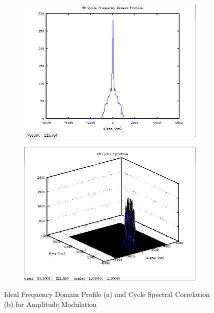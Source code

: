 \begin{figure}
\centering
\begin{subfigure}{.49\textwidth}
\centering
\includegraphics[width=\linewidth]{../img/Report_AM_Ia_Ideal.png}
  \caption{ }
  \label{fig:idealProfile_AM}
\end{subfigure}
\begin{subfigure}{.49\textwidth}
  \centering
  \includegraphics[width=\linewidth]{../img/Report_AM_Sxa_Ideal.png}
  \caption{ }
  \label{fig:idealCycle_AM}
\end{subfigure}
\caption{Ideal Frequency Domain Profile (a) and Cycle Spectral Correlation (b)
for Amplitude Modulation}
\label{fig:test}
\end{figure}

